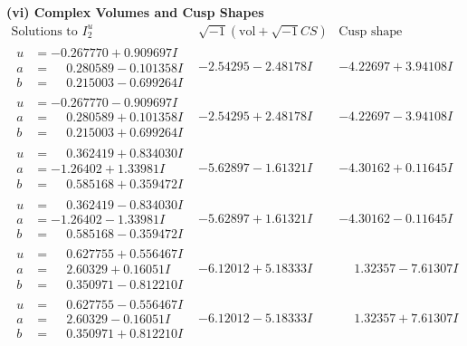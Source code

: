 \documentclass[1p]{elsarticle_modified}
\theoremstyle{definition}
\newcommand{\I}{\sqrt{-1}}
\begin{document}
\newpage\flushleft \textbf{(vi) Complex Volumes and Cusp Shapes}
$$\begin{array}{c|c|c}  
\text{Solutions to }I^u_{2}& \I (\text{vol} + \sqrt{-1}CS) & \text{Cusp shape}\\
 \hline 
\begin{aligned}
u &= -0.267770 + 0.909697 I \\
a &= \phantom{-}0.280589 - 0.101358 I \\
b &= \phantom{-}0.215003 - 0.699264 I\end{aligned}
 & -2.54295 - 2.48178 I & -4.22697 + 3.94108 I \\ \hline\begin{aligned}
u &= -0.267770 - 0.909697 I \\
a &= \phantom{-}0.280589 + 0.101358 I \\
b &= \phantom{-}0.215003 + 0.699264 I\end{aligned}
 & -2.54295 + 2.48178 I & -4.22697 - 3.94108 I \\ \hline\begin{aligned}
u &= \phantom{-}0.362419 + 0.834030 I \\
a &= -1.26402 + 1.33981 I \\
b &= \phantom{-}0.585168 + 0.359472 I\end{aligned}
 & -5.62897 - 1.61321 I & -4.30162 + 0.11645 I \\ \hline\begin{aligned}
u &= \phantom{-}0.362419 - 0.834030 I \\
a &= -1.26402 - 1.33981 I \\
b &= \phantom{-}0.585168 - 0.359472 I\end{aligned}
 & -5.62897 + 1.61321 I & -4.30162 - 0.11645 I \\ \hline\begin{aligned}
u &= \phantom{-}0.627755 + 0.556467 I \\
a &= \phantom{-}2.60329 + 0.16051 I \\
b &= \phantom{-}0.350971 - 0.812210 I\end{aligned}
 & -6.12012 + 5.18333 I & \phantom{-}1.32357 - 7.61307 I \\ \hline\begin{aligned}
u &= \phantom{-}0.627755 - 0.556467 I \\
a &= \phantom{-}2.60329 - 0.16051 I \\
b &= \phantom{-}0.350971 + 0.812210 I\end{aligned}
 & -6.12012 - 5.18333 I & \phantom{-}1.32357 + 7.61307 I \\ \hline\begin{aligned}

\end{aligned}
\end{array}$$
\end{document}
